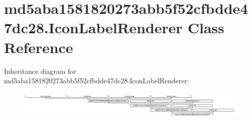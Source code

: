 \hypertarget{classmd5aba1581820273abb5f52cfbdde47dc28_1_1IconLabelRenderer}{}\section{md5aba1581820273abb5f52cfbdde47dc28.\+Icon\+Label\+Renderer Class Reference}
\label{classmd5aba1581820273abb5f52cfbdde47dc28_1_1IconLabelRenderer}
Inheritance diagram for md5aba1581820273abb5f52cfbdde47dc28.\+Icon\+Label\+Renderer\+:\begin{figure}[H]
\begin{center}
\leavevmode
\includegraphics[height=1.372549cm]{classmd5aba1581820273abb5f52cfbdde47dc28_1_1IconLabelRenderer}
\end{center}
\end{figure}
